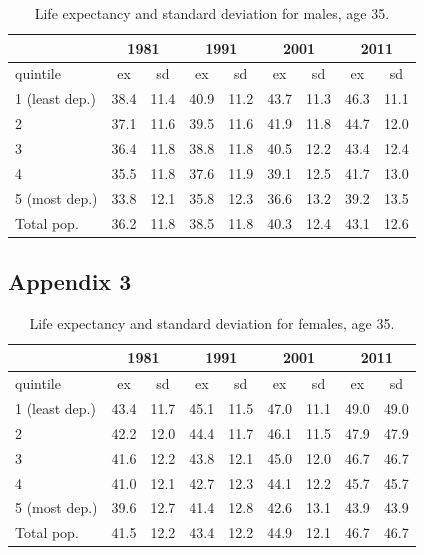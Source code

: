 \documentclass[12pt,oneside,a4paper]{article} %
\theoremstyle{definition}
\begin{document}
\begin{table}[htbp]
  \centering
  \caption{Life expectancy and standard deviation for males, age 35.}
    \begin{tabular}{lrrrrrrrr}
          & \multicolumn{2}{c}{1981} & \multicolumn{2}{c}{1991} & \multicolumn{2}{c}{2001} & \multicolumn{2}{c}{2011} \\
    \midrule
    quintile & \multicolumn{1}{c}{ex} & \multicolumn{1}{c}{sd} & \multicolumn{1}{c}{ex} & \multicolumn{1}{c}{sd} & \multicolumn{1}{c}{ex} & \multicolumn{1}{c}{sd} & \multicolumn{1}{c}{ex} & \multicolumn{1}{c}{sd} \\
    \midrule
    1 (least dep.) & 38.4  & 11.4  & 40.9  & 11.2  & 43.7  & 11.3  & 46.3  & 11.1 \\
    2     & 37.1  & 11.6  & 39.5  & 11.6  & 41.9  & 11.8  & 44.7  & 12.0 \\
    3     & 36.4  & 11.8  & 38.8  & 11.8  & 40.5  & 12.2  & 43.4  & 12.4 \\
    4     & 35.5  & 11.8  & 37.6  & 11.9  & 39.1  & 12.5  & 41.7  & 13.0 \\
    5 (most dep.) & 33.8  & 12.1  & 35.8  & 12.3  & 36.6  & 13.2  & 39.2  & 13.5 \\
    Total pop. & 36.2  & 11.8  & 38.5  & 11.8  & 40.3  & 12.4  & 43.1  & 12.6 \\
    \bottomrule
    \end{tabular}%
  \label{tab:addlabel}%
\end{table}%

\subsection{Appendix 3}
\begin{table}[htbp]
  \centering
  \caption{Life expectancy and standard deviation for females, age 35.}
    \begin{tabular}{lrrrrrrrr}
          & \multicolumn{2}{c}{1981} & \multicolumn{2}{c}{1991} & \multicolumn{2}{c}{2001} & \multicolumn{2}{c}{2011} \\
    \midrule
    quintile & \multicolumn{1}{c}{ex} & \multicolumn{1}{c}{sd} & \multicolumn{1}{c}{ex} & \multicolumn{1}{c}{sd} & \multicolumn{1}{c}{ex} & \multicolumn{1}{c}{sd} & \multicolumn{1}{c}{ex} & \multicolumn{1}{c}{sd} \\
    \midrule
    1 (least dep.) & 43.4  & 11.7  & 45.1  & 11.5  & 47.0  & 11.1  & 49.0  & 49.0 \\
    2     & 42.2  & 12.0  & 44.4  & 11.7  & 46.1  & 11.5  & 47.9  & 47.9 \\
    3     & 41.6  & 12.2  & 43.8  & 12.1  & 45.0  & 12.0  & 46.7  & 46.7 \\
    4     & 41.0  & 12.1  & 42.7  & 12.3  & 44.1  & 12.2  & 45.7  & 45.7 \\
    5 (most dep.) & 39.6  & 12.7  & 41.4  & 12.8  & 42.6  & 13.1  & 43.9  & 43.9 \\
    Total pop. & 41.5  & 12.2  & 43.4  & 12.2  & 44.9  & 12.1  & 46.7  & 46.7 \\
    \bottomrule
    \end{tabular}%
  \label{tab:addlabel}%
\end{table}%
\end{document}
